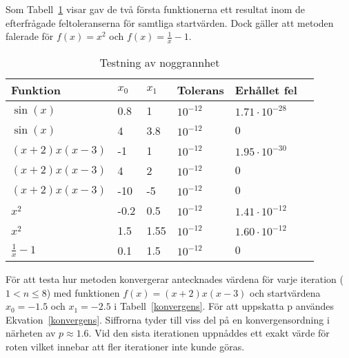 \documentclass[12pt]{article}
\begin{document}
Som Tabell~\ref{noggrannhet} visar gav de två första funktionerna ett resultat inom de efterfrågade feltoleranserna för samtliga startvärden. Dock gäller att metoden falerade för $f(x) = x^2$ och $f(x)=\frac{1}{x} - 1$.
\begin{table}[H]
  \centering
  \begin{tabu}{ l l l l l l }
    Funktion & $x_0$ & $x_1$ & Tolerans & Erhållet fel \\
    \toprule
    $\sin(x)$          & 0.8  & 1   & $10^{-12}$ & $1.71\cdot 10^{-28}$ \\
    $\sin(x)$          & 4    & 3.8 & $10^{-12}$ & $0$\\
    $ (x+2) x (x-3)$   & -1   & 1   & $10^{-12}$  & $1.95\cdot 10^{-30}$ \\
    $ (x+2) x (x-3)$   & 4    & 2   & $10^{-12}$  & $0$ \\
    $ (x+2) x (x-3)$   & -10  & -5 & $10^{-12}$   & $0$ \\
    $ x^{2}$           & -0.2 & 0.5 & $10^{-12}$  & $1.41\cdot 10^{-12} $ \\
    $ x^{2}$           & 1.5 & 1.55 & $10^{-12}$  & $1.60\cdot 10^{-12} $ \\
    $\frac{1}{x} - 1 $ & 0.1  & 1.5 & $10^{-12}$  & $0$ \\
  \end{tabu}
  \caption{Testning av noggrannhet}\label{noggrannhet}
\end{table}

För att testa hur metoden konvergerar antecknades värdena för varje iteration ($1 < n \leq 8$) med funktionen $f(x)=(x+2) x (x-3)$ och startvärdena $x_0=-1.5$ och $x_1=-2.5$ i Tabell~\ref{konvergens}. För att uppskatta p användes Ekvation~\ref{konvergens}. Siffrorna tyder till viss del på en konvergensordning i närheten av $p\approx 1.6$. Vid den sista iterationen uppnåddes ett exakt värde för roten vilket innebar att fler iterationer inte kunde göras.
\end{document}
